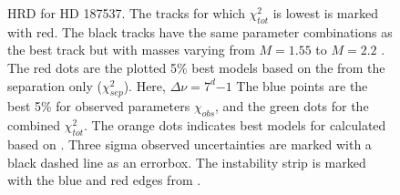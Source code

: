 \begin{figure}[htbp]
	\centering
	\caption{HRD for HD 187537. The tracks for which $\chi_{tot}^2$ is lowest is marked with red. The black tracks have the same parameter combinations as the best track but with masses varying from $M=1.55$ to $M=2.2$ \msun. The red dots are the plotted 5\% best models based on the \chis from the separation only ($\chi_{sep}^2$).  Here, $\Delta \nu = 7^d{-1}$ The blue points are the best 5\% for observed parameters $\chi_{obs}$, and the green dots for the combined $\chi_{tot}^2$. The orange dots indicates best models for \chis calculated based on \lum. Three sigma observed uncertainties are marked with a black dashed line as an errorbox. The instability strip is marked with the blue and red edges from \citet{murphy2019gaia}.}
	\label{finalsuper}
\end{figure}

